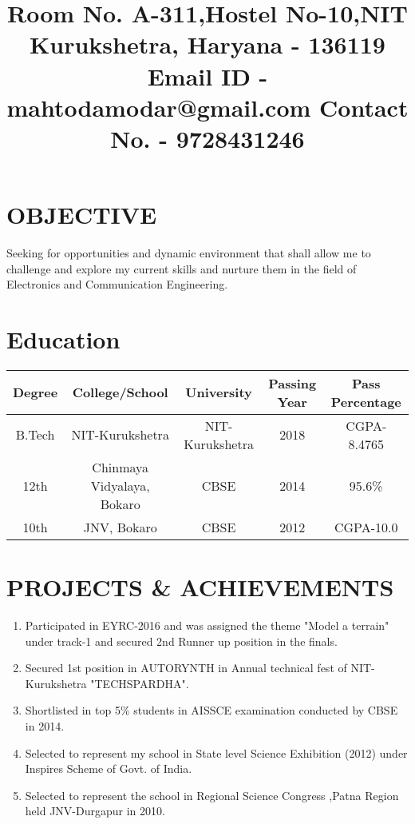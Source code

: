 \documentclass[11pt,a4paper,sans]{moderncv}
\title{   \newline Room No.  A-311,\newline Hostel No-10,\newline NIT Kurukshetra, \newline Haryana - 136119 \newline Email ID - mahtodamodar@gmail.com \newline Contact No. - 9728431246}
\begin{document}
\makecvtitle

\section{OBJECTIVE}
Seeking for opportunities and dynamic environment that shall allow me to challenge and explore my current skills and nurture them in the field of Electronics and Communication Engineering.

\section{Education}
\begin{center}
\begin{tabular}{ |c|c|c|c|c| } 
\hline
Degree & College/School & University & Passing Year & Pass Percentage \\
\hline
\multirow {1}{4em}{B.Tech} & { NIT-Kurukshetra } & { NIT-Kurukshetra } & {2018} & {CGPA-8.4765} \\ 
\hline
\multirow {1}{4em}{12th} & { Chinmaya Vidyalaya, Bokaro } & { CBSE } & {2014} & {95.6\%}\\
\hline
\multirow {1}{4em}{10th} & { JNV, Bokaro } & { CBSE } & {2012} & {CGPA-10.0}\\
\hline
\end{tabular}
\end{center}

\section{PROJECTS \& ACHIEVEMENTS}
\begin{enumerate}
\item Participated in EYRC-2016 and was assigned the theme "Model a terrain" under track-1 and secured 2nd Runner up position in the finals.
\item Secured 1st position in AUTORYNTH in Annual technical fest of NIT-Kurukshetra "TECHSPARDHA".
\item Shortlisted in top 5\% students in AISSCE examination conducted by CBSE in 2014.
\item Selected to represent my school in State level Science Exhibition (2012) under Inspires Scheme of Govt. of India.
\item Selected to represent the school in Regional Science Congress ,Patna Region held JNV-Durgapur in 2010.  
\end{enumerate}
\end{document}
